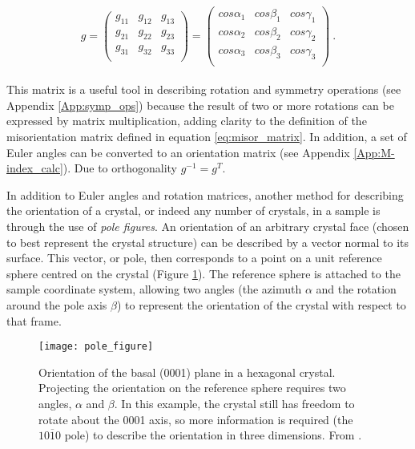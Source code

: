 \documentclass[a4paper,12pt,twoside]{report}
\numberwithin{equation}{chapter}
\begin{document}
\begin{equation}
g = 
\begin{pmatrix}
g_{11} & g_{12} & g_{13} \\
g_{21} & g_{22} & g_{23} \\
g_{31} & g_{32} & g_{33} \\
\end{pmatrix}
= 
\begin{pmatrix}
cos \alpha_1 & cos \beta_1 & cos \gamma_1 \\
cos \alpha_2 & cos \beta_2 & cos \gamma_2 \\
cos \alpha_3 & cos \beta_3 & cos \gamma_3 \\
\end{pmatrix}\ .
\end{equation}
\\
This matrix is a useful tool in describing rotation and symmetry operations (see Appendix \ref{App:symp_ops}) because the result of two or more rotations can be expressed by matrix multiplication, adding clarity to the definition of the misorientation matrix defined in equation \ref{eq:misor_matrix}. In addition, a set of Euler angles can be converted to an orientation matrix (see Appendix \ref{App:M-index_calc}). Due to orthogonality $g^{-1} = g^T$. 


In addition to Euler angles and rotation matrices, another method for describing the orientation of a crystal, or indeed any number of crystals, in a sample is through the use of \emph{pole figures}. An orientation of an arbitrary crystal face (chosen to best represent the crystal structure) can be described by a vector normal to its surface. This vector, or pole, then corresponds to a point on a unit reference sphere centred on the crystal (Figure \ref{fig:spherical_orientation}). The reference sphere is attached to the sample coordinate system, allowing two angles (the azimuth $\alpha$ and the rotation around the pole axis $\beta$) to represent the orientation of the crystal with respect to that frame.  




\begin{figure}[h!]
  \centering
    \texttt{[image: pole\_figure]}
  \caption[Pole figure visualisation]{Orientation of the basal (0001) plane in a hexagonal crystal. Projecting the orientation on the reference sphere requires two angles, $\alpha$ and $\beta$. In this example, the crystal still has freedom to rotate about the 0001 axis, so more information is required (the $\mathit{10\overline{1}0}$ pole) to describe the orientation in three dimensions. From \cite{Randle2000}.}
  \label{fig:spherical_orientation}
\end{figure}
\end{document}
